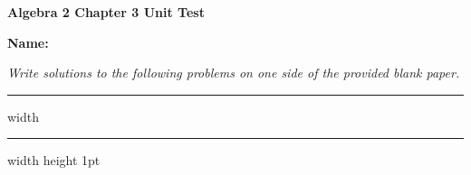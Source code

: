\documentclass[addpoints,12pt]{exam}
\begin{document}
\thispagestyle{empty}
\pagestyle{empty}

{\large\bfseries Algebra 2 \hfill Chapter 3 Unit Test}

\vspace{16pt}
{\bfseries Name: \underline{\hspace{3in}}}

\medskip
{\em Write solutions to the following problems on one side of the provided blank paper.}

\bigskip
\hrule width \hsize \kern 0.5mm \hrule width \hsize height 1pt 

%
\end{document}
